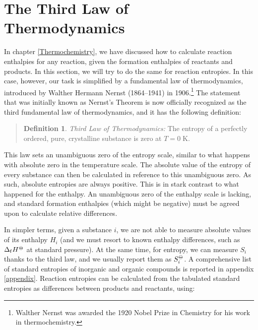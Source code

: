 \documentclass[
  9pt,
]{extbook}
\theoremstyle{definition}
\newtheorem{definition}{Definition}[chapter]
\theoremstyle{definition}
\theoremstyle{definition}
\theoremstyle{remark}
\begin{document}
\hypertarget{thirdlawsect}{%
\section{The Third Law of Thermodynamics}\label{thirdlawsect}}

In chapter \ref{Thermochemistry}, we have discussed how to calculate reaction enthalpies for any reaction, given the formation enthalpies of reactants and products. In this section, we will try to do the same for reaction entropies. In this case, however, our task is simplified by a fundamental law of thermodynamics, introduced by Walther Hermann Nernst (1864--1941) in 1906.\footnote{Walther Nernst was awarded the 1920 Nobel Prize in Chemistry for his work in thermochemistry.} The statement that was initially known as Nernst's Theorem is now officially recognized as the third fundamental law of thermodynamics, and it has the following definition:

\begin{quote}
\begin{definition}
\protect\hypertarget{def:thirdlawdef}{}{\label{def:thirdlawdef} }\emph{Third Law of Thermodynamics:} The entropy of a perfectly ordered, pure, crystalline substance is zero at \(T=0 \; \text{K}\).
\end{definition}
\end{quote}

This law sets an unambiguous zero of the entropy scale, similar to what happens with absolute zero in the temperature scale. The absolute value of the entropy of every substance can then be calculated in reference to this unambiguous zero. As such, absolute entropies are always positive. This is in stark contrast to what happened for the enthalpy. An unambiguous zero of the enthalpy scale is lacking, and standard formation enthalpies (which might be negative) must be agreed upon to calculate relative differences.

In simpler terms, given a substance \(i\), we are not able to measure absolute values of its enthalpy \(H_i\) (and we must resort to known enthalpy differences, such as \(\Delta_{\mathrm{f}} H^{-\kern-6pt{\ominus}\kern-6pt-}\) at standard pressure). At the same time, for entropy, we can measure \(S_i\) thanks to the third law, and we usually report them as \(S_i^{-\kern-6pt{\ominus}\kern-6pt-}\). A comprehensive list of standard entropies of inorganic and organic compounds is reported in appendix \ref{appendix}. Reaction entropies can be calculated from the tabulated standard entropies as differences between products and reactants, using:
\end{document}
